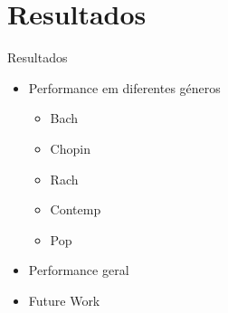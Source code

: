 \section{Resultados}
\begin{frame}{Resultados}{}
    \begin{itemize}
        \item Performance em diferentes géneros
        \begin{itemize}
            \item Bach
            \item Chopin
            \item Rach
            \item Contemp
            \item Pop
        \end{itemize}
        \item Performance geral
        \item Future Work
    \end{itemize}
\end{frame}

